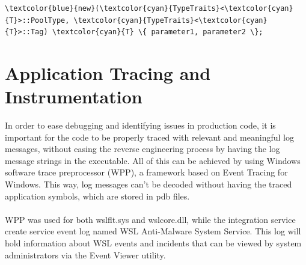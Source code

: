 \begin{Verbatim}[fontsize=\small, commandchars=\\\{\}]
    \textcolor{blue}{new}(\textcolor{cyan}{TypeTraits}<\textcolor{cyan}{T}>::PoolType, \textcolor{cyan}{TypeTraits}<\textcolor{cyan}{T}>::Tag) \textcolor{cyan}{T} \{ parameter1, parameter2 \};
\end{Verbatim}

    \section{Application Tracing and Instrumentation}
        In order to ease debugging and identifying issues in production code, it is important for the code to be properly traced with relevant
        and meaningful log messages, without easing the reverse engineering process by having the log message strings in the executable. All of
        this can be achieved by using Windows software trace preprocessor (WPP), a framework based on Event Tracing for Windows. This way, 
        log messages can't be decoded without having the traced application symbols, which are stored in pdb files.

        \paragraph{}
        WPP was used for both wslflt.sys and wslcore.dll, while the integration service create service event log named WSL Anti-Malware System 
        Service. This log will hold information about WSL events and incidents that can be viewed by system administrators via the Event Viewer
        utility.